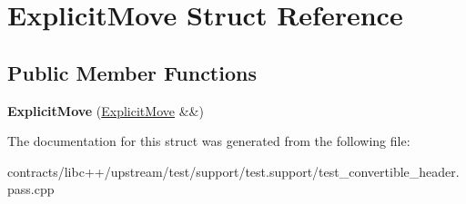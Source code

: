 \hypertarget{struct_explicit_move}{}\section{Explicit\+Move Struct Reference}
\label{struct_explicit_move}
\subsection*{Public Member Functions}
\begin{DoxyCompactItemize}
\item 
\mbox{\label{struct_explicit_move_ad40ce6f826ec6301e8e47b436c9c4724}} 
{\bfseries Explicit\+Move} (\mbox{\hyperlink{struct_explicit_move}{Explicit\+Move}} \&\&)
\end{DoxyCompactItemize}


The documentation for this struct was generated from the following file\+:\begin{DoxyCompactItemize}
\item 
contracts/libc++/upstream/test/support/test.\+support/test\+\_\+convertible\+\_\+header.\+pass.\+cpp\end{DoxyCompactItemize}
